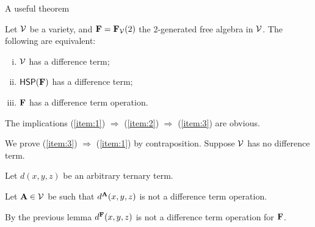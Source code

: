 \documentclass[12pt,xcolor=dvipsnames%
   ]{beamer}
\begin{document}
\begin{frame}[shrink=25]{A useful theorem}
\begin{theorem}[Kearnes (1998)]
  \label{thm:F}
  Let $\mathcal{V}$ be a variety, and $\mathbf{F} = \mathbf{F}_{\mathcal{V}}(2)$ the 2-generated
  free algebra in $\mathcal{V}$. The following are equivalent:
  \begin{enumerate}[(i)]
  \item \label{item:1}
    $\mathcal{V}$ has a difference term;
  \item \label{item:2}
    $\mathsf{H} \mathsf{S} \mathsf{P} (\mathbf{F})$ has a difference term;
  \item \label{item:3}
    $\mathbf{F}$ has a difference term operation.
  \end{enumerate}
\end{theorem}
  The implications
  (\ref{item:1}) $\Rightarrow$  (\ref{item:2}) $\Rightarrow$  (\ref{item:3}) are
  obvious. 

  \vskip2mm
  \pause 
  We prove
  (\ref{item:3}) $\Rightarrow$  (\ref{item:1}) by contraposition.
  Suppose $\mathcal{V}$ has no difference term. 

  \vskip2mm
  Let $d(x,y,z)$ be an arbitrary ternary term.
  
  \vskip2mm
  Let $\mathbf{A}\in \mathcal{V}$ be such that $d^{\mathbf{A}}(x,y,z)$ is not a difference term
  operation. 

  \vskip2mm
  By the previous lemma %
  $d^{\mathbf{F}}(x,y,z)$ is not a difference term operation for $\mathbf{F}$.
\end{frame}
\end{document}
